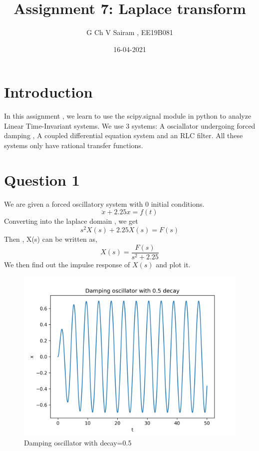 \documentclass[11pt, a4paper]{article}
\title{Assignment 7: Laplace transform}
\author{G Ch V Sairam , EE19B081}
\date{16-04-2021}
\begin{document}
		
		
\maketitle
\section*{Introduction}
In this assignment , we learn to use the scipy.signal module in python to analyze Linear Time-Invariant systems. We use 3 systems: A osciallator undergoing forced damping , A coupled differential equation system and an RLC filter. All these systems only have rational transfer functions.

\section*{Question 1}
We are given a forced oscillatory system with 0 initial conditions.
\begin{equation}
    \ddot x + 2.25x = f(t)
\end{equation}
Converting into the laplace domain , we get
\begin{equation}
    s^2 X(s) + 2.25X(s) = F(s)
\end{equation}
Then , X(s) can be written as,
\begin{equation}
    X(s) = \frac{F(s)}{s^2+2.25}
\end{equation}
We then find out the impulse response of $X(s)$ and plot it.



\begin{figure}[!tbh]
\centering
\includegraphics[scale=0.55]{assgn7_plot1.png} 
\caption{Damping oscillator with decay=0.5}
\label{fig1}
\end{figure}
\end{document}
